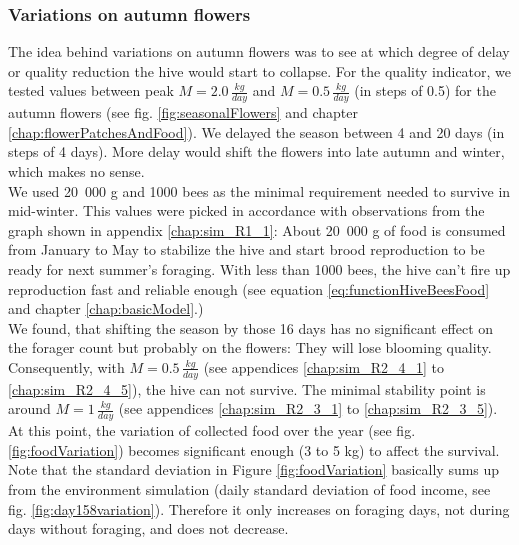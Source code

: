 	\subsubsection{Variations on autumn flowers}
		\label{chap:variationsOnAutumnFlowers}
		The idea behind variations on autumn flowers was to see at which degree of delay or quality reduction the hive would start to collapse. For the quality indicator, we tested values between peak $M = 2.0\,\frac{kg}{day}$ and $M = 0.5\,\frac{kg}{day}$ (in steps of 0.5) for the autumn flowers (see fig. \ref{fig:seasonalFlowers} and chapter \ref{chap:flowerPatchesAndFood}). We delayed the season between 4 and 20 days (in steps of 4 days). More delay would shift the flowers into late autumn and winter, which makes no sense.\\
		We used 20~000 g and 1000 bees as the minimal requirement needed to survive in mid-winter. This values were picked in accordance with observations from the graph shown in appendix \ref{chap:sim_R1_1}: About 20~000 g of food is consumed from January to May to stabilize the hive and start brood reproduction to be ready for next summer's foraging. With less than 1000 bees, the hive can't fire up reproduction fast and reliable enough (see equation \ref{eq:functionHiveBeesFood} and chapter \ref{chap:basicModel}.)\\
		We found, that shifting the season by those 16 days has no significant effect on the forager count but probably on the flowers: They will lose blooming quality. Consequently, with $M = 0.5\,\frac{kg}{day}$ (see appendices \ref{chap:sim_R2_4_1} to \ref{chap:sim_R2_4_5}), the hive can not survive. The minimal stability point is around $M = 1\,\frac{kg}{day}$ (see appendices \ref{chap:sim_R2_3_1} to \ref{chap:sim_R2_3_5}). At this point, the variation of collected food over the year (see fig. \ref{fig:foodVariation}) becomes significant enough (3 to 5 kg) to affect the survival.\\
		
		Note that the standard deviation in Figure \ref{fig:foodVariation} basically sums up from the environment simulation (daily standard deviation of food income, see fig. \ref{fig:day158variation}). Therefore it only increases on foraging days, not during days without foraging, and does not decrease.
		
